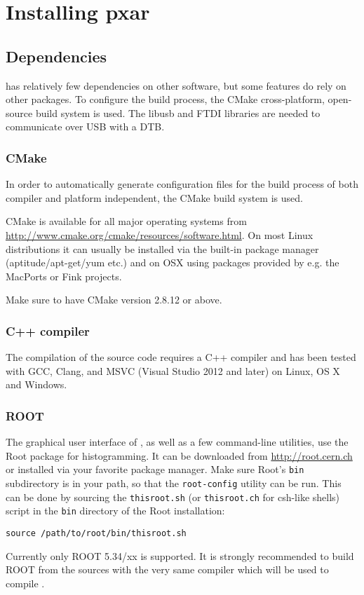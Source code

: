 \section{Installing pxar}
\label{s:install}

\subsection{Dependencies}
\label{ss:overview}

\pxar has relatively few dependencies on other software, but some
features do rely on other packages. To configure the \pxar build process, the CMake cross-platform, open-source build system is used. The libusb and FTDI libraries are needed to communicate over USB with a DTB.

\subsubsection{CMake}
In order to automatically generate configuration files for the build process of \pxar both compiler and platform independent, the CMake build system is used.

CMake is available for all major operating systems from \url{http://www.cmake.org/cmake/resources/software.html}. On most Linux distributions it can usually be installed via the built-in package manager (aptitude/apt-get/yum etc.) and on OSX using
packages provided by e.g. the MacPorts or Fink projects.

Make sure to have CMake version 2.8.12 or above.

\subsubsection{C++ compiler}
The compilation of the \pxar source code requires a C++ compiler and has been tested with GCC, Clang, and MSVC (Visual
Studio 2012 and later) on Linux, OS X and Windows.

\subsubsection{ROOT}
The graphical user interface of \pxar, as well as a few command-line utilities,
use the Root package for histogramming. It can be downloaded from \url{http://root.cern.ch} or installed via
your favorite package manager. Make sure Root's \texttt{bin} subdirectory is in your path, so that the \texttt{root-config} utility can be run. This can be done by sourcing the \texttt{thisroot.sh} (or \texttt{thisroot.ch} for csh-like shells)
script in the \texttt{bin} directory of the Root installation:
\begin{verbatim}
source /path/to/root/bin/thisroot.sh
\end{verbatim}
Currently only ROOT 5.34/xx is supported. It is strongly recommended to build ROOT from the sources with the very same compiler which will be used to compile \pxar.

